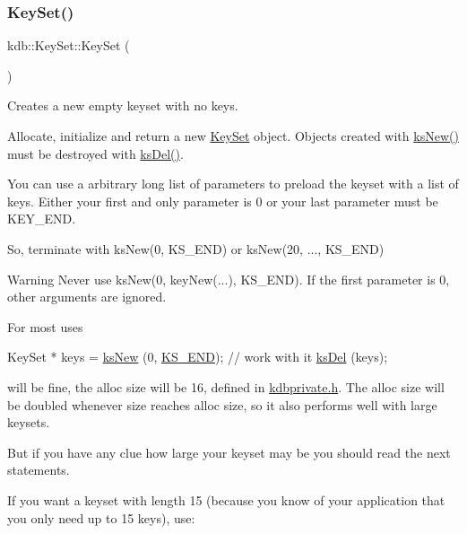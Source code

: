 \subsubsection{\texorpdfstring{Key\+Set()}{KeySet()}\hspace{0.1cm}{\footnotesize\ttfamily [1/5]}}
{\footnotesize\ttfamily kdb\+::\+Key\+Set\+::\+Key\+Set (\begin{DoxyParamCaption}{ }\end{DoxyParamCaption})\hspace{0.3cm}{\ttfamily [inline]}}



Creates a new empty keyset with no keys. 

Allocate, initialize and return a new \hyperlink{classkdb_1_1KeySet}{Key\+Set} object. Objects created with \hyperlink{group__keyset_ga671e1aaee3ae9dc13b4834a4ddbd2c3c}{ks\+New()} must be destroyed with \hyperlink{group__keyset_ga27e5c16473b02a422238c8d970db7ac8}{ks\+Del()}.

You can use a arbitrary long list of parameters to preload the keyset with a list of keys. Either your first and only parameter is 0 or your last parameter must be K\+E\+Y\+\_\+\+E\+ND.

So, terminate with ks\+New(0, K\+S\+\_\+\+E\+N\+D) or ks\+New(20, ..., K\+S\+\_\+\+E\+ND)

\begin{DoxyWarning}{Warning}
Never use ks\+New(0, key\+New(...), K\+S\+\_\+\+E\+ND). If the first parameter is 0, other arguments are ignored.
\end{DoxyWarning}
For most uses


\begin{DoxyCodeInclude}
KeySet * keys = \hyperlink{group__keyset_ga671e1aaee3ae9dc13b4834a4ddbd2c3c}{ksNew} (0, \hyperlink{kdbenum_8c_a7a28fce3773b2c873c94ac80b8b4cd54}{KS\_END});
\textcolor{comment}{// work with it}
\hyperlink{group__keyset_ga27e5c16473b02a422238c8d970db7ac8}{ksDel} (keys);
\end{DoxyCodeInclude}
 will be fine, the alloc size will be 16, defined in \hyperlink{kdbprivate_8h}{kdbprivate.\+h}. The alloc size will be doubled whenever size reaches alloc size, so it also performs well with large keysets.

But if you have any clue how large your keyset may be you should read the next statements.

If you want a keyset with length 15 (because you know of your application that you only need up to 15 keys), use\+:


